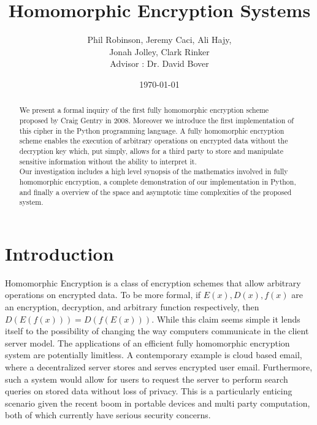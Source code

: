 \documentclass[letterpaper,11pt]{article} %
\title{Homomorphic Encryption Systems}
\date{\today}
\author{
Phil Robinson, Jeremy Caci, Ali Hajy,\\
Jonah Jolley, Clark Rinker\\
Advisor : Dr. David Bover}
\begin{document}
\maketitle

\begin{abstract}
\hspace{1em}We present a formal inquiry of the first fully homomorphic encryption scheme proposed by Craig Gentry in 2008. Moreover we introduce the first implementation of this cipher in the Python programming language. A fully homomorphic encryption scheme enables the execution of arbitrary operations on encrypted data without the decryption key which, put simply, allows for a third party to  store and manipulate sensitive information without the ability to interpret it.\\ 

\hspace{1em}Our investigation includes a high level synopsis of the mathematics involved in fully homomorphic encryption, a complete demonstration of our implementation in Python, and finally a overview of the space and asymptotic time complexities of the proposed system. 
\end{abstract}


\section*{Introduction}

	Homomorphic Encryption is a class of encryption schemes that allow arbitrary operations on encrypted data. To be more formal, if $E(x),D(x),f(x)$ are an encryption, decryption, and arbitrary function respectively, then $D(E(f(x)))=D(f(E(x)))$. While this claim seems simple it lends itself to the possibility of changing the way computers communicate in the client server model. The applications of an efficient fully homomorphic encryption system are potentially limitless. A contemporary example is cloud based email, where a decentralized server stores and serves encrypted user email. Furthermore, such a system would allow for users to request the server to perform search queries on stored data without loss of privacy. This is a particularly enticing scenario given the recent boom in portable devices and multi party computation, both of which currently have serious security concerns. \\
\end{document}
